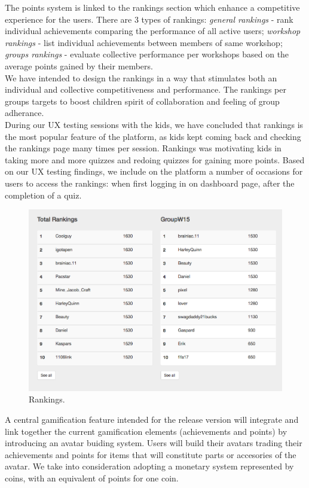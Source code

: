 The points system is linked to the rankings section which enhance a competitive experience for the users. 
There are 3 types of rankings: \textit{general rankings} - rank individual achievements comparing the performance of all active users; \textit{workshop rankings} - list individual achievements between members of same workshop; \textit{groups rankings} - evaluate collective performance per workshops based on the average points gained by their members. \\

We have intended to design the rankings in a way that stimulates both an individual and collective competitiveness and performance. The rankings per groups targets to boost children spirit of collaboration and feeling of group adherance. \\

During our UX testing sessions with the kids, we have concluded that rankings is the most popular feature of the platform, as kids kept coming back and checking the rankings page many times per session. Rankings was motivating kids in taking more and more quizzes and redoing quizzes for gaining more points.
Based on our UX testing findings, we include on the platform a number of occasions for users to access the rankings: when first logging in on dashboard page, after the completion of a quiz.
\\

\begin{figure}
\includegraphics[width=1\linewidth]{images/ui/Rankings.png}
\caption{Rankings.}
\label{fig:Rankings}
\end{figure}

A central gamification feature intended for the release version will integrate and link together the current gamification elements (achievements and points) by introducing an avatar buiding system. Users will build their avatars trading their achievements and points for items that will constitute parts or accesories of the avatar. We take into consideration adopting a monetary system represented by coins, with an equivalent of points for one coin.

